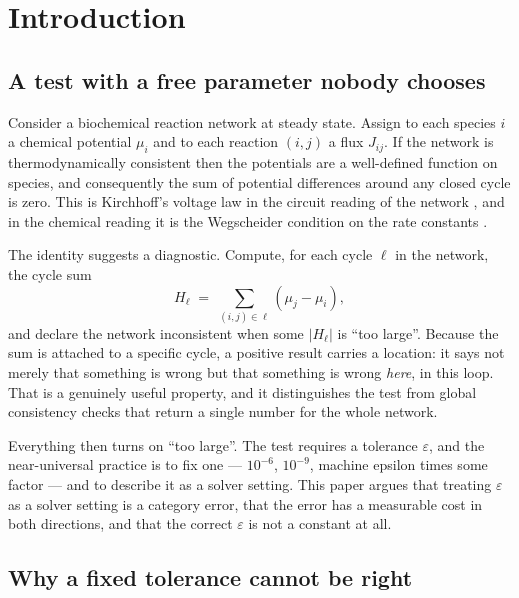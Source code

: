 \documentclass[11pt,twocolumn,a4paper]{article}
\theoremstyle{pstyle}
\theoremstyle{definition}
\theoremstyle{remark}
\newcommand{\abs}[1]{\lvert#1\rvert}
\newcommand{\eps}{\varepsilon}
\newcommand{\hol}{H}
\begin{document}
\section{Introduction}
\label{sec:intro}

\subsection{A test with a free parameter nobody chooses}

Consider a biochemical reaction network at steady state. Assign to each
species $i$ a chemical potential $\mu_i$ and to each reaction $(i,j)$ a
flux $J_{ij}$. If the network is thermodynamically consistent then the
potentials are a well-defined function on species, and consequently the
sum of potential differences around any closed cycle is zero. This is
Kirchhoff's voltage law in the circuit reading of the network
\citep{oster1971,peusner1986}, and in the chemical reading it is the
Wegscheider condition on the rate constants \citep{wegscheider1901,
schuster1989}.

The identity suggests a diagnostic. Compute, for each cycle $\ell$ in the
network, the cycle sum
\begin{equation}
  \hol_\ell \;=\; \sum_{(i,j)\in\ell} (\mu_j - \mu_i),
  \label{eq:cyclesum-informal}
\end{equation}
and declare the network inconsistent when some $\abs{\hol_\ell}$ is
``too large''. Because the sum is attached to a specific cycle, a
positive result carries a location: it says not merely that something is
wrong but that something is wrong \emph{here}, in this loop. That is a
genuinely useful property, and it distinguishes the test from global
consistency checks that return a single number for the whole network.

Everything then turns on ``too large''. The test requires a tolerance
$\eps$, and the near-universal practice is to fix one --- $10^{-6}$,
$10^{-9}$, machine epsilon times some factor --- and to describe it as a
solver setting. This paper argues that treating $\eps$ as a solver
setting is a category error, that the error has a measurable cost in
both directions, and that the correct $\eps$ is not a constant at all.

\subsection{Why a fixed tolerance cannot be right}
\end{document}
